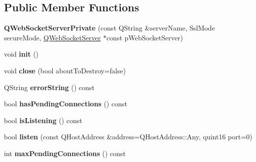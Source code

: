 \subsection*{Public Member Functions}
\begin{DoxyCompactItemize}
\item 
\mbox{\label{class_q_web_socket_server_private_a01fa7efabf6a258cf145b673ffff8471}} 
{\bfseries Q\+Web\+Socket\+Server\+Private} (const Q\+String \&server\+Name, Ssl\+Mode secure\+Mode, \mbox{\hyperlink{class_q_web_socket_server}{Q\+Web\+Socket\+Server}} $\ast$const p\+Web\+Socket\+Server)
\item 
\mbox{\label{class_q_web_socket_server_private_a5e88133b309ef033fc94e3676a7880f2}} 
void {\bfseries init} ()
\item 
\mbox{\label{class_q_web_socket_server_private_a9f138597a2df4187108d7f7e08366c9a}} 
void {\bfseries close} (bool about\+To\+Destroy=false)
\item 
\mbox{\label{class_q_web_socket_server_private_ab76ca2e42b820dac0896e326db070bd9}} 
Q\+String {\bfseries error\+String} () const
\item 
\mbox{\label{class_q_web_socket_server_private_a1cf60113bf03e60ac5787aef08d5aee0}} 
bool {\bfseries has\+Pending\+Connections} () const
\item 
\mbox{\label{class_q_web_socket_server_private_a09c6947efeba906c44d7831a1b0ab206}} 
bool {\bfseries is\+Listening} () const
\item 
\mbox{\label{class_q_web_socket_server_private_af938f19d9733328295f5f890651e788b}} 
bool {\bfseries listen} (const Q\+Host\+Address \&address=Q\+Host\+Address\+::\+Any, quint16 port=0)
\item 
\mbox{\label{class_q_web_socket_server_private_a9812bbb6894dedc7c9e9bed82ea5bcb4}} 
int {\bfseries max\+Pending\+Connections} () const
\item 
\mbox{\label{class_q_web_socket_server_private_a9ca10770ecc5badac2b12cd4cc7b8fcd}} 

\end{DoxyCompactItemize}

